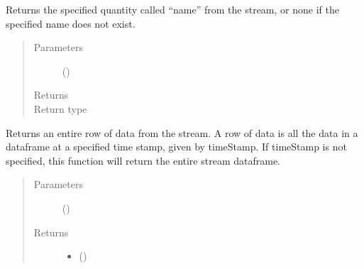 \documentclass[letterpaper,10pt,openany,oneside,english]{sphinxmanual}
\begin{document}
\begin{fulllineitems}
\begin{fulllineitems}
\end{fulllineitems}


\begin{fulllineitems}
\label{\detokenize{support_rst/stream:stream.Stream.GetQuantity}}
Returns the specified quantity called “name” from the stream, or none
if the specified name does not exist.
\begin{quote}\begin{description}
\item[{Parameters}] \leavevmode
{} () \textendash{} 

\item[{Returns}] \leavevmode
{}

\item[{Return type}] \leavevmode
{}

\end{description}\end{quote}

\end{fulllineitems}


\begin{fulllineitems}
\label{\detokenize{support_rst/stream:stream.Stream.GetRow}}
Returns an entire row of data from the stream. A row of data is all
the data in a dataframe at a specified time stamp, given by timeStamp.
If timeStamp is not specified, this function will return the entire
stream dataframe.
\begin{quote}\begin{description}
\item[{Parameters}] \leavevmode
{} () \textendash{} 

\item[{Returns}] \leavevmode
\begin{itemize}
\item {} 
\sphinxstylestrong{self.stream.loc{[}self.timestamp,} (\sphinxstyleemphasis{{]}) or self.stream.loc{[}timeStamp, :{]}):})


\end{itemize}
\end{description}
\end{quote}
\end{fulllineitems}
\end{fulllineitems}
\end{document}
